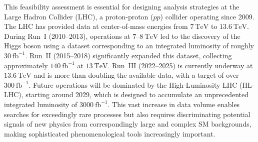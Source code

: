 This feasibility assessment is essential for designing analysis strategies at the Large Hadron Collider (LHC), a proton-proton ($pp$) collider operating since 2009. The LHC has provided data at center-of-mass energies from $7~\mathrm{TeV}$ to $13.6~\mathrm{TeV}$. During Run~I (2010–2013), operations at $7$–$8~\mathrm{TeV}$ led to the discovery of the Higgs boson using a dataset corresponding to an integrated luminosity of roughly $30~\mathrm{fb}^{-1}$. Run~II (2015–2018) significantly expanded this dataset, collecting approximately $140~\mathrm{fb}^{-1}$ at $13~\mathrm{TeV}$. Run~III (2022–2025) is currently underway at $13.6~\mathrm{TeV}$ and is more than doubling the available data, with a target of over $300~\mathrm{fb}^{-1}$. Future operations will be dominated by the High-Luminosity LHC (HL-LHC), starting around 2029, which is designed to accumulate an unprecedented integrated luminosity of $3000~\mathrm{fb}^{-1}$. This vast increase in data volume enables searches for exceedingly rare processes but also requires discriminating potential signals of new physics from correspondingly large and complex SM backgrounds, making sophisticated phenomenological tools increasingly important.

 
 
 
 
